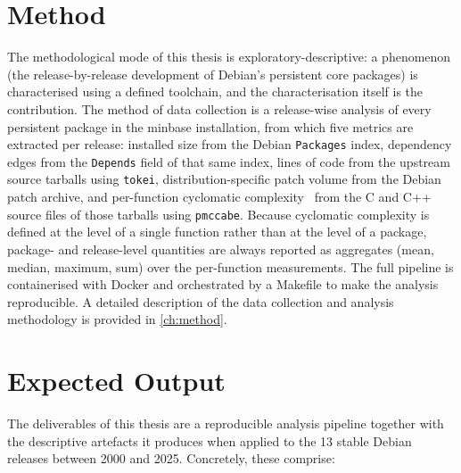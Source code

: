 \section*{Method}
The methodological mode of this thesis is exploratory-descriptive: a phenomenon (the release-by-release development of Debian's persistent core packages) is characterised using a defined toolchain, and the characterisation itself is the contribution. The method of data collection is a release-wise analysis of every persistent package in the minbase installation, from which five metrics are extracted per release: installed size from the Debian \texttt{Packages} index, dependency edges from the \texttt{Depends} field of that same index, lines of code from the upstream source tarballs using \texttt{tokei}, distribution-specific patch volume from the Debian patch archive, and per-function cyclomatic complexity~\cite{CyclomaticComplexity} from the C and C++ source files of those tarballs using \texttt{pmccabe}. Because cyclomatic complexity is defined at the level of a single function rather than at the level of a package, package- and release-level quantities are always reported as aggregates (mean, median, maximum, sum) over the per-function measurements. The full pipeline is containerised with Docker and orchestrated by a Makefile to make the analysis reproducible. A detailed description of the data collection and analysis methodology is provided in \autoref{ch:method}.

\section*{Expected Output}
The deliverables of this thesis are a reproducible analysis pipeline together with the descriptive artefacts it produces when applied to the 13 stable Debian releases between 2000 and 2025. Concretely, these comprise:

